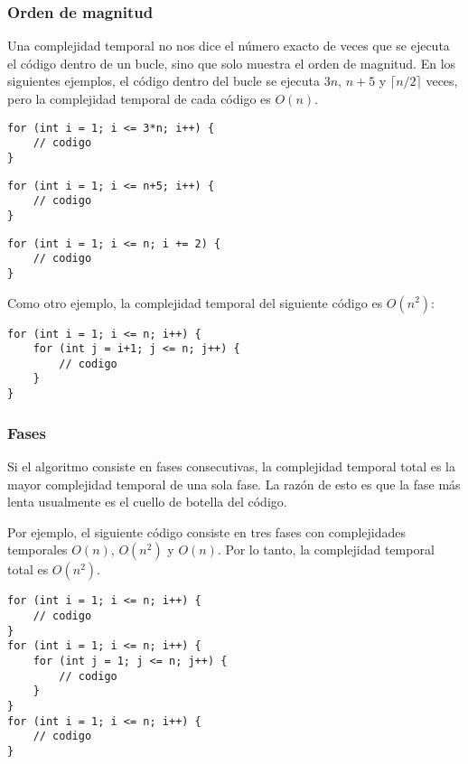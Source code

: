 \subsubsection*{Orden de magnitud}

Una complejidad temporal no nos dice el número exacto
de veces que se ejecuta el código dentro de un bucle,
sino que solo muestra el orden de magnitud.
En los siguientes ejemplos, el código dentro del bucle
se ejecuta $3n$, $n+5$ y $\lceil n/2 \rceil$ veces,
pero la complejidad temporal de cada código es $O(n)$.

\begin{lstlisting}
for (int i = 1; i <= 3*n; i++) {
    // codigo
}
\end{lstlisting}

\begin{lstlisting}
for (int i = 1; i <= n+5; i++) {
    // codigo
}
\end{lstlisting}

\begin{lstlisting}
for (int i = 1; i <= n; i += 2) {
    // codigo
}
\end{lstlisting}

Como otro ejemplo,
la complejidad temporal del siguiente código es $O(n^2)$:

\begin{lstlisting}
for (int i = 1; i <= n; i++) {
    for (int j = i+1; j <= n; j++) {
        // codigo
    }
}
\end{lstlisting}

\subsubsection*{Fases}

Si el algoritmo consiste en fases consecutivas,
la complejidad temporal total es la mayor
complejidad temporal de una sola fase.
La razón de esto es que la fase más lenta
usualmente es el cuello de botella del código.

Por ejemplo, el siguiente código consiste
en tres fases con complejidades temporales
$O(n)$, $O(n^2)$ y $O(n)$.
Por lo tanto, la complejidad temporal total es $O(n^2)$.

\begin{lstlisting}
for (int i = 1; i <= n; i++) {
    // codigo
}
for (int i = 1; i <= n; i++) {
    for (int j = 1; j <= n; j++) {
        // codigo
    }
}
for (int i = 1; i <= n; i++) {
    // codigo
}
\end{lstlisting}

